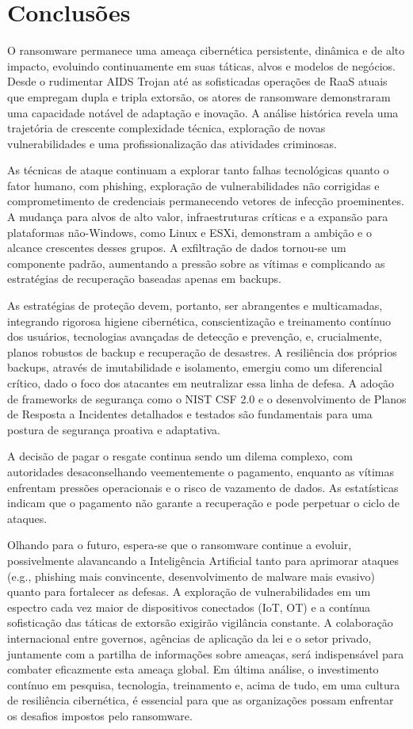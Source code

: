 \section*{Conclusões}
O ransomware permanece uma ameaça cibernética persistente, dinâmica e de alto impacto, evoluindo 
continuamente em suas táticas, alvos e modelos de negócios. Desde o rudimentar AIDS Trojan até as sofisticadas 
operações de RaaS atuais que empregam dupla e tripla extorsão, os atores de ransomware demonstraram uma capacidade 
notável de adaptação e inovação. A análise histórica revela uma trajetória de crescente complexidade técnica, exploração de 
novas vulnerabilidades e uma profissionalização das atividades criminosas.

As técnicas de ataque continuam a explorar tanto falhas tecnológicas quanto o fator humano, com phishing, exploração de 
vulnerabilidades não corrigidas e comprometimento de credenciais permanecendo vetores de infecção proeminentes. A mudança para 
alvos de alto valor, infraestruturas críticas e a expansão para plataformas não-Windows, como Linux e ESXi, demonstram a ambição 
e o alcance crescentes desses grupos. A exfiltração de dados tornou-se um componente padrão, aumentando a pressão sobre as vítimas 
e complicando as estratégias de recuperação baseadas apenas em backups.

As estratégias de proteção devem, portanto, ser abrangentes e multicamadas, integrando rigorosa higiene cibernética, 
conscientização e treinamento contínuo dos usuários, tecnologias avançadas de detecção e prevenção, e, crucialmente, planos 
robustos de backup e recuperação de desastres. A resiliência dos próprios backups, através de imutabilidade e isolamento, 
emergiu como um diferencial crítico, dado o foco dos atacantes em neutralizar essa linha de defesa. A adoção de frameworks de 
segurança como o NIST CSF 2.0 e o desenvolvimento de Planos de Resposta a Incidentes detalhados e testados são fundamentais para 
uma postura de segurança proativa e adaptativa.

A decisão de pagar o resgate continua sendo um dilema complexo, com autoridades desaconselhando veementemente o pagamento, 
enquanto as vítimas enfrentam pressões operacionais e o risco de vazamento de dados. As estatísticas indicam que o pagamento 
não garante a recuperação e pode perpetuar o ciclo de ataques.

Olhando para o futuro, espera-se que o ransomware continue a evoluir, possivelmente alavancando a 
Inteligência Artificial tanto para aprimorar ataques (e.g., phishing mais convincente, desenvolvimento de malware mais evasivo) 
quanto para fortalecer as defesas. A exploração de vulnerabilidades em um espectro cada vez maior de dispositivos 
conectados (IoT, OT) e a contínua sofisticação das táticas de extorsão exigirão vigilância constante. A colaboração internacional 
entre governos, agências de aplicação da lei e o setor privado, juntamente com a partilha de informações sobre ameaças, será 
indispensável para combater eficazmente esta ameaça global. Em última análise, o investimento contínuo em pesquisa, tecnologia, 
treinamento e, acima de tudo, em uma cultura de resiliência cibernética, é essencial para que as organizações possam enfrentar os 
desafios impostos pelo ransomware.